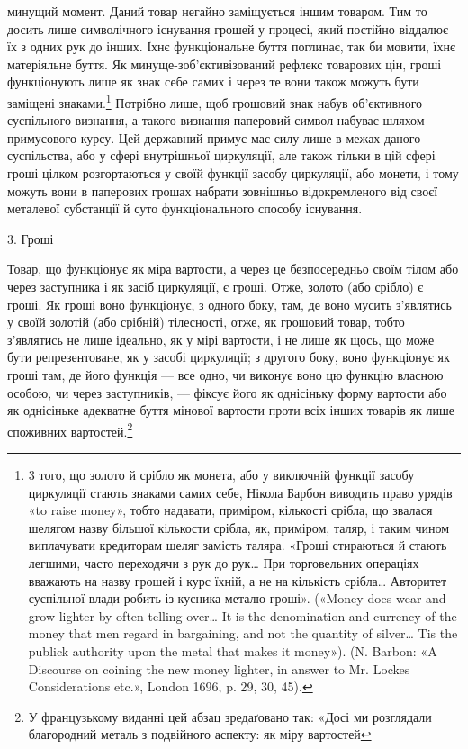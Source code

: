 \parcont{}  %
минущий момент. Даний товар негайно заміщується іншим товаром.
Тим то досить лише символічного існування грошей у процесі,
який постійно віддалює їх з одних рук до інших. Їхнє функціональне
буття поглинає, так би мовити, їхнє матеріяльне буття.
Як минуще-зоб’єктивізований рефлекс товарових цін, гроші
функціонують лише як знак себе самих і через те вони також
можуть бути заміщені знаками.\footnote{
3 того, що золото й срібло як монета, або у виключній функції
засобу циркуляції стають знаками самих себе, Нікола Барбон виводить
право урядів «to raise money», тобто надавати, приміром, кількості срібла,
що звалася шелягом назву більшої кількости срібла, як, приміром, таляр,
і таким чином виплачувати кредиторам шеляг замість таляра. «Гроші
стираються й стають легшими, часто переходячи з рук до рук\dots{} При торговельних
операціях вважають на назву грошей і курс їхній, а не на кількість
срібла\dots{} Авторитет суспільної влади робить із кусника металю
гроші». («Money does wear and grow lighter by often telling over\dots{} It is
the denomination and currency of the money that men regard in bargaining,
and not the quantity of silver\dots{} Tis the publick authority upon the metal
that makes it money»). (N. Barbon: «A Discourse on coining the new
money lighter, in answer to Mr. Lockes Considerations etc.», London 1696,
p. 29, 30, 45).
} Потрібно лише, щоб грошовий
знак набув об’єктивного суспільного визнання, а такого визнання
паперовий символ набуває шляхом примусового курсу. Цей
державний примус має силу лише в межах даного суспільства,
або у сфері внутрішньої циркуляції, але також тільки в цій
сфері гроші цілком розгортаються у своїй функції засобу циркуляції,
або монети, і тому можуть вони в паперових грошах набрати
зовнішньо відокремленого від своєї металевої субстанції й суто
функціонального способу існування.

3. Гроші

Товар, що функціонує як міра вартости, а через це безпосередньо
своїм тілом або через заступника і як засіб циркуляції,
є гроші. Отже, золото (або срібло) є гроші. Як гроші воно функціонує,
з одного боку, там, де воно мусить з’являтись у своїй
золотій (або срібній) тілесності, отже, як грошовий товар, тобто
з’являтись не лише ідеально, як у мірі вартости, і не лише як
щось, що може бути репрезентоване, як у засобі циркуляції;
з другого боку, воно функціонує як гроші там, де його функція —
все одно, чи виконує воно цю функцію власною особою, чи через
заступників, — фіксує його як однісіньку форму вартости або як
однісіньке адекватне буття мінової вартости проти всіх інших
товарів як лише споживних вартостей.\footnote*{
У французькому виданні цей абзац зредаґовано так: «Досі ми розглядали
благородний металь з подвійного аспекту: як міру вартостей
}

